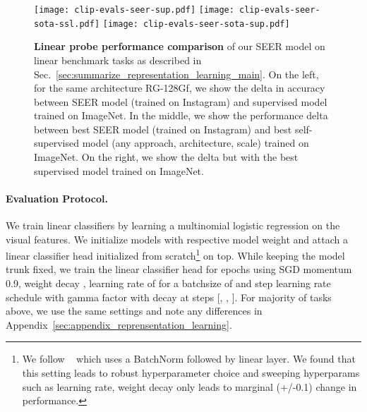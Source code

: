 \documentclass[10pt,twocolumn,letterpaper]{article}
\begin{document}
\begin{figure*}[t]
  \centering
  \texttt{[image: clip-evals-seer-sup.pdf]}
  \texttt{[image: clip-evals-seer-sota-ssl.pdf]}
  \texttt{[image: clip-evals-seer-sota-sup.pdf]}
  \caption{
     \textbf{Linear probe performance comparison} of our SEER model on  linear benchmark tasks as described in Sec.~\ref{sec:summarize_representation_learning_main}. On the left, for the same architecture RG-128Gf, we show the delta in accuracy between SEER model (trained on Instagram) and supervised model trained on ImageNet. In the middle, we show the performance delta between best SEER model (trained on Instagram) and best self-supervised model (any approach, architecture, scale) trained on ImageNet. On the right, we show the delta but with the best supervised model trained on ImageNet. 
  }
  \label{fig:linear_probe_comparison_summary}
\end{figure*}

\paragraph{Evaluation Protocol.}
We train linear classifiers by learning a multinomial logistic regression on the visual features. We initialize models with respective model weight and attach a linear classifier head initialized from scratch\footnote{We follow ~\cite{goyal2019scaling} which uses a BatchNorm followed by linear layer. We found that this setting leads to robust hyperparameter choice and sweeping hyperparams such as learning rate, weight decay only leads to marginal (+/-0.1) change in performance.} on top. While keeping the model trunk fixed, we train the linear classifier head for  epochs using SGD momentum 0.9, weight decay , learning rate of  for a batchsize of  and step learning rate schedule with gamma factor  with decay at steps [, , ]. For majority of tasks above, we use the same settings and note any differences in Appendix~\ref{sec:appendix_reprensentation_learning}.
\end{document}
